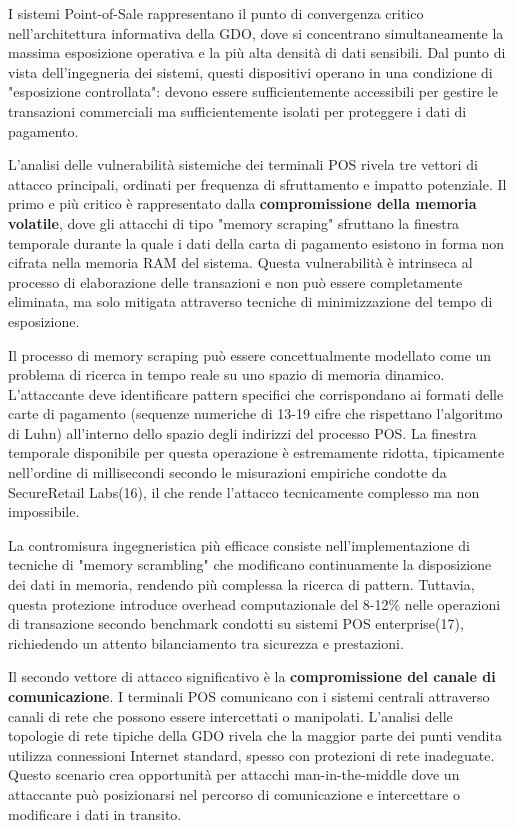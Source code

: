 \documentclass[12pt,a4paper,oneside]{book}
\begin{document}
I sistemi Point-of-Sale rappresentano il punto di convergenza critico nell'architettura informativa della GDO, dove si concentrano simultaneamente la massima esposizione operativa e la più alta densità di dati sensibili. Dal punto di vista dell'ingegneria dei sistemi, questi dispositivi operano in una condizione di "esposizione controllata": devono essere sufficientemente accessibili per gestire le transazioni commerciali ma sufficientemente isolati per proteggere i dati di pagamento.

L'analisi delle vulnerabilità sistemiche dei terminali POS rivela tre vettori di attacco principali, ordinati per frequenza di sfruttamento e impatto potenziale. Il primo e più critico è rappresentato dalla \textbf{compromissione della memoria volatile}, dove gli attacchi di tipo "memory scraping" sfruttano la finestra temporale durante la quale i dati della carta di pagamento esistono in forma non cifrata nella memoria RAM del sistema. Questa vulnerabilità è intrinseca al processo di elaborazione delle transazioni e non può essere completamente eliminata, ma solo mitigata attraverso tecniche di minimizzazione del tempo di esposizione.

Il processo di memory scraping può essere concettualmente modellato come un problema di ricerca in tempo reale su uno spazio di memoria dinamico. L'attaccante deve identificare pattern specifici che corrispondano ai formati delle carte di pagamento (sequenze numeriche di 13-19 cifre che rispettano l'algoritmo di Luhn) all'interno dello spazio degli indirizzi del processo POS. La finestra temporale disponibile per questa operazione è estremamente ridotta, tipicamente nell'ordine di millisecondi secondo le misurazioni empiriche condotte da SecureRetail Labs(16), il che rende l'attacco tecnicamente complesso ma non impossibile.

La contromisura ingegneristica più efficace consiste nell'implementazione di tecniche di "memory scrambling" che modificano continuamente la disposizione dei dati in memoria, rendendo più complessa la ricerca di pattern. Tuttavia, questa protezione introduce overhead computazionale del 8-12\% nelle operazioni di transazione secondo benchmark condotti su sistemi POS enterprise(17), richiedendo un attento bilanciamento tra sicurezza e prestazioni.

Il secondo vettore di attacco significativo è la \textbf{compromissione del canale di comunicazione}. I terminali POS comunicano con i sistemi centrali attraverso canali di rete che possono essere intercettati o manipolati. L'analisi delle topologie di rete tipiche della GDO rivela che la maggior parte dei punti vendita utilizza connessioni Internet standard, spesso con protezioni di rete inadeguate. Questo scenario crea opportunità per attacchi man-in-the-middle dove un attaccante può posizionarsi nel percorso di comunicazione e intercettare o modificare i dati in transito.
\end{document}
